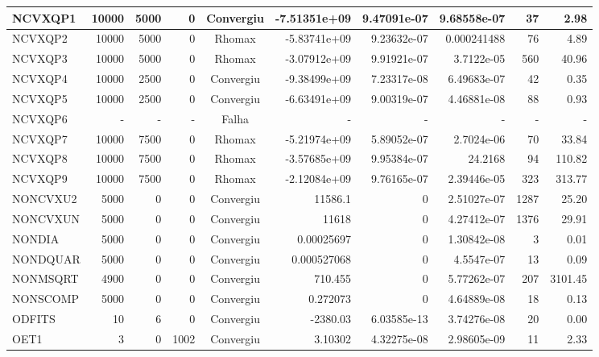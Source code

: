 \begin{center}
\begin{longtable}{|l|r|r|r|c|r|r|r|r|r|}
 NCVXQP1 &  10000 &   5000 &      0 & Convergiu  & -7.51351e+09 &    9.47091e-07 & 9.68558e-07 &     37 &    2.98 \\ \hline
 NCVXQP2 &  10000 &   5000 &      0 & Rhomax     & -5.83741e+09 &    9.23632e-07 & 0.000241488 &     76 &    4.89 \\ \hline
 NCVXQP3 &  10000 &   5000 &      0 & Rhomax     & -3.07912e+09 &    9.91921e-07 &  3.7122e-05 &    560 &   40.96 \\ \hline
 NCVXQP4 &  10000 &   2500 &      0 & Convergiu  & -9.38499e+09 &    7.23317e-08 & 6.49683e-07 &     42 &    0.35 \\ \hline
 NCVXQP5 &  10000 &   2500 &      0 & Convergiu  & -6.63491e+09 &    9.00319e-07 & 4.46881e-08 &     88 &    0.93 \\ \hline
NCVXQP6 & - & - & - & Falha & - & - & - & - & - \\ \hline
 NCVXQP7 &  10000 &   7500 &      0 & Rhomax     & -5.21974e+09 &    5.89052e-07 &  2.7024e-06 &     70 &   33.84 \\ \hline
 NCVXQP8 &  10000 &   7500 &      0 & Rhomax     & -3.57685e+09 &    9.95384e-07 &     24.2168 &     94 &  110.82 \\ \hline
 NCVXQP9 &  10000 &   7500 &      0 & Rhomax     & -2.12084e+09 &    9.76165e-07 & 2.39446e-05 &    323 &  313.77 \\ \hline
NONCVXU2 &   5000 &      0 &      0 & Convergiu  &     11586.1 &              0 & 2.51027e-07 &   1287 &   25.20 \\ \hline
NONCVXUN &   5000 &      0 &      0 & Convergiu  &       11618 &              0 & 4.27412e-07 &   1376 &   29.91 \\ \hline
  NONDIA &   5000 &      0 &      0 & Convergiu  &  0.00025697 &              0 & 1.30842e-08 &      3 &    0.01 \\ \hline
NONDQUAR &   5000 &      0 &      0 & Convergiu  & 0.000527068 &              0 &  4.5547e-07 &     13 &    0.09 \\ \hline
NONMSQRT &   4900 &      0 &      0 & Convergiu  &     710.455 &              0 & 5.77262e-07 &    207 & 3101.45 \\ \hline
NONSCOMP &   5000 &      0 &      0 & Convergiu  &    0.272073 &              0 & 4.64889e-08 &     18 &    0.13 \\ \hline
  ODFITS &     10 &      6 &      0 & Convergiu  &    -2380.03 &    6.03585e-13 & 3.74276e-08 &     20 &    0.00 \\ \hline
    OET1 &      3 &      0 &   1002 & Convergiu  &     3.10302 &    4.32275e-08 & 2.98605e-09 &     11 &    2.33 \\ \hline

\end{longtable}
\end{center}
